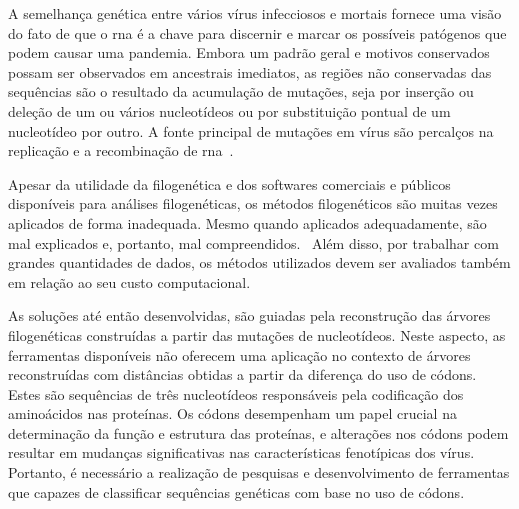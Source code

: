 A semelhança genética entre vários vírus infecciosos e mortais fornece uma visão do fato de que o \gls{rna} é a chave para discernir e marcar os possíveis patógenos que podem causar uma pandemia. Embora um padrão geral e motivos conservados possam ser observados em ancestrais imediatos, as regiões não conservadas das sequências são o resultado da acumulação de mutações, seja por inserção ou deleção de um ou vários nucleotídeos ou por substituição pontual de um nucleotídeo por outro. A fonte principal de mutações em vírus são percalços na replicação e a recombinação de \gls{rna}~\cite{behl_threat_2022}.

Apesar da utilidade da filogenética e dos softwares comerciais e públicos disponíveis para análises filogenéticas, os métodos filogenéticos são muitas vezes aplicados de forma inadequada. Mesmo quando aplicados adequadamente, são mal explicados e, portanto, mal compreendidos.~\cite[p. 1]{barry_phylogenetic_analysis_2006} Além disso, por trabalhar com grandes quantidades de dados, os métodos utilizados devem ser avaliados também em relação ao seu custo computacional.


As soluções até então desenvolvidas, são guiadas pela reconstrução das árvores filogenéticas construídas a partir das mutações de nucleotídeos. Neste aspecto, as ferramentas disponíveis não oferecem uma aplicação no contexto de árvores reconstruídas com distâncias obtidas a partir da diferença do uso de códons. Estes são sequências de três nucleotídeos responsáveis pela codificação dos aminoácidos nas proteínas. Os códons desempenham um papel crucial na determinação da função e estrutura das proteínas, e alterações nos códons podem resultar em mudanças significativas nas características fenotípicas dos vírus. Portanto, é necessário a realização de pesquisas e desenvolvimento de ferramentas que capazes de classificar sequências genéticas com base no uso de códons.


